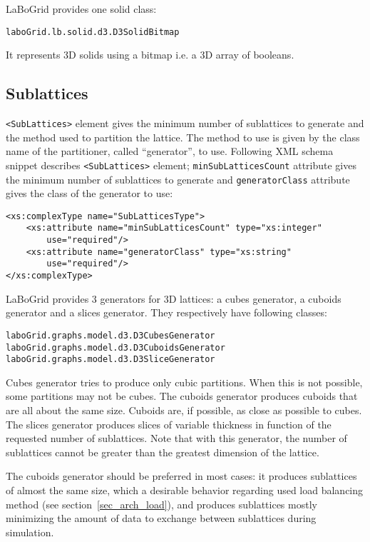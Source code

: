 LaBoGrid provides one solid class:

\begin{center}
\texttt{laboGrid.lb.solid.d3.D3SolidBitmap}
\end{center}

It represents 3D solids using a bitmap i.e. a 3D array of booleans.


\subsection{Sublattices}

\verb|<SubLattices>| element gives the minimum number of sublattices to generate
and the method used to partition the lattice. The method to use is given by
the class name of the partitioner, called ``generator'', to use. Following XML
schema snippet describes \verb|<SubLattices>| element;
\texttt{minSubLatticesCount} attribute gives the minimum number of sublattices
to generate and \texttt{generatorClass} attribute gives the class of the
generator to use:

\begin{Verbatim}[tabsize=2,frame=lines]
<xs:complexType name="SubLatticesType">
	<xs:attribute name="minSubLatticesCount" type="xs:integer"
		use="required"/>
	<xs:attribute name="generatorClass" type="xs:string"
		use="required"/>
</xs:complexType>
\end{Verbatim}

LaBoGrid provides 3 generators for 3D lattices: a cubes generator, a cuboids
generator and a slices generator. They respectively have following classes:

\begin{center}
\texttt{laboGrid.graphs.model.d3.D3CubesGenerator}\\
\texttt{laboGrid.graphs.model.d3.D3CuboidsGenerator}\\
\texttt{laboGrid.graphs.model.d3.D3SliceGenerator}
\end{center}

Cubes generator tries to produce only
cubic partitions. When this is not possible, some partitions may not be cubes.
The cuboids generator
produces cuboids that are all about the same size. Cuboids are, if possible, as
close as possible to cubes. The slices generator produces slices of variable
thickness in function of the requested number of sublattices. Note that with
this generator, the number of sublattices cannot be greater than the greatest
dimension of the lattice.

The cuboids generator should be preferred in most cases: it produces sublattices
of almost the same size, which a desirable behavior regarding used load
balancing method (see section~\ref{sec_arch_load}), and produces sublattices
mostly minimizing the amount of data to exchange between sublattices during
simulation.

